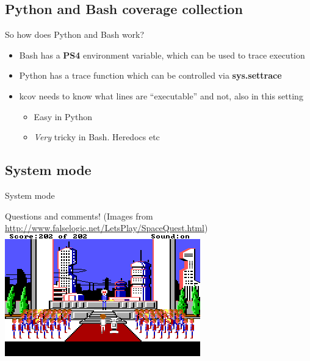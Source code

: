 \documentclass{beamer}
\begin{document}
\subsection{Python and Bash coverage collection}

\begin{frame}{So how does Python and Bash work?}
  \begin{itemize}
  \item Bash has a \textbf{PS4} environment variable, which can be used to trace execution
  \item Python has a trace function which can be controlled via \textbf{sys.settrace}
  \item kcov needs to know what lines are ``executable'' and not, also in this setting
    \begin{itemize}
    \item Easy in Python
    \item \textit{Very} tricky in Bash. Heredocs etc
    \end{itemize}
  \end{itemize}
\end{frame}

\subsection{System mode}
\begin{frame}{System mode}
\end{frame}

\begin{frame}{Questions and comments!}
  \footnotesize
  (Images from \url{http://www.falselogic.net/LetsPlay/SpaceQuest.html})
  \includegraphics[width=\linewidth]{sq_final}
\end{frame}
\end{document}
